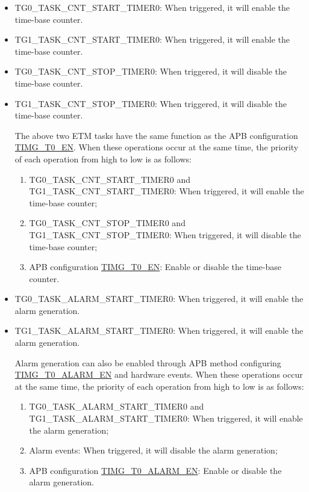 \documentclass[main\_\_EN.tex]{subfiles}
\begin{document}
\begin{itemize}
    \item TG0\_TASK\_CNT\_START\_TIMER0: When triggered, it will enable the time-base counter.
    \item TG1\_TASK\_CNT\_START\_TIMER0: When triggered, it will enable the time-base counter.
    \item TG0\_TASK\_CNT\_STOP\_TIMER0: When triggered, it will disable the time-base counter.
    \item TG1\_TASK\_CNT\_STOP\_TIMER0: When triggered, it will disable the time-base counter.


\begin{tiplisting}
The above two ETM tasks have the same function as the APB configuration \hyperref[fielddesc:TIMGTXEN]{TIMG\_T0\_EN}. When these operations occur at the same time, the priority of each operation from high to low is as follows:

\begin{enumerate}
    \item TG0\_TASK\_CNT\_START\_TIMER0 and TG1\_TASK\_CNT\_START\_TIMER0: When triggered, it will enable the time-base counter;
    \item TG0\_TASK\_CNT\_STOP\_TIMER0 and TG1\_TASK\_CNT\_STOP\_TIMER0: When triggered, it will disable the time-base counter;
    \item APB configuration \hyperref[fielddesc:TIMGTXEN]{TIMG\_T0\_EN}: Enable or disable the time-base counter.
\end{enumerate}
\end{tiplisting}

\item TG0\_TASK\_ALARM\_START\_TIMER0: When triggered, it will enable the alarm generation.
\item TG1\_TASK\_ALARM\_START\_TIMER0: When triggered, it will enable the alarm generation.

\begin{tiplisting}
Alarm generation can also be enabled through APB method configuring \hyperref[fielddesc:TIMGTXALARMEN]{TIMG\_T0\_ALARM\_EN} and hardware events. When these operations occur at the same time, the priority of each operation from high to low is as follows:

\begin{enumerate}
    \item TG0\_TASK\_ALARM\_START\_TIMER0 and TG1\_TASK\_ALARM\_START\_TIMER0: When triggered, it will enable the alarm generation;
    \item Alarm events: When triggered, it will disable the alarm generation;
    \item APB configuration \hyperref[fielddesc:TIMGTXALARMEN]{TIMG\_T0\_ALARM\_EN}: Enable or disable the alarm generation.
\end{enumerate}
\end{tiplisting}



\end{itemize}
\end{document}
